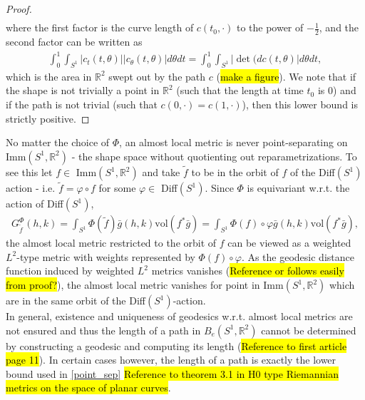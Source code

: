 \documentclass[a4,danish]{article}
\theoremstyle{break}
\theoremstyle{definition}
\theoremstyle{Break}
\newcommand{\R}{\mathbb{R}}
\renewcommand{\phi}{\varphi}
\begin{document}
\begin{proof}
\begin{align*}
\end{align*}
where the first factor is the curve length of $c(t_0, \cdot)$ to the power of $-\frac{1}{2}$, and the second factor can be written as
\begin{align*}
\int_0^1 \int_{S^1} \left| c_t(t, \theta) \right| \left| c_\theta(t, \theta) \right| d \theta dt = \int_0^1 \int_{S^1} \left| \det (d c(t, \theta) \right| d \theta dt,
\end{align*}
which is the area in $\R^2$ swept out by the path $c$ (\hl{make a figure}). We note that if the shape is not trivially a point in $\R^2$ (such that the length at time $t_0$ is $0$) and if the path is not trivial (such that $c(0, \cdot) = c(1, \cdot)$), then this lower bound is strictly positive. 



 
\end{proof}

No matter the choice of $\Phi$, an almost local metric is never point-separating on Imm$(S^1, \R^2)$ - the shape space without quotienting out reparametrizations. To see this let $f \in$ Imm$(S^1, \R^2)$ and take $\tilde{f}$ to be in the orbit of $f$ of the Diff$(S^1)$ action - i.e. $\tilde{f} = \phi \circ f$ for some $\phi \in$ Diff$(S^1)$. Since $\Phi$ is equivariant w.r.t. the action of Diff$(S^1)$, 
\begin{align*}
G_{\tilde{f}}^\Phi (h,k) = \int_{S^1} \Phi(\tilde{f}) \bar{g}(h,k) \text{vol}(f^* \bar{g}) = \int_{S^1} \Phi(f) \circ \phi \bar{g}(h,k) \text{vol}(f^* \bar{g}),
\end{align*}
the almost local metric restricted to the orbit of $f$ can be viewed as a weighted $L^2$-type metric with weights represented by $\Phi(f) \circ \phi$. As the geodesic distance function induced by weighted $L^2$ metrics vanishes (\hl{Reference or follows easily from proof?}), the almost local metric vanishes for point in Imm$(S^1, \R^2)$ which are in the same orbit of the Diff$(S^1)$-action.
\\[0.2 cm]
In general, existence and uniqueness of geodesics w.r.t. almost local metrics are not ensured and thus the length of a path in $B_e(S^1,\R^2)$ cannot be determined by constructing a geodesic and computing its length (\hl{Reference to first article page 11}). In certain cases however, the length of a path is exactly the lower bound used in \ref{point_sep} \hl{Reference to theorem 3.1 in H0 type Riemannian metrics on the space of planar curves}.
\end{document}

